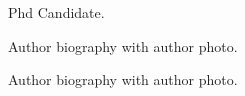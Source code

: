 \documentclass[a4paper,fleqn]{cas-dc}
\begin{document}
%






Phd Candidate.
\endbio

\bio{}
Author biography with author photo.
\endbio

\bio{}
Author biography with author photo.
\endbio
\end{document}
